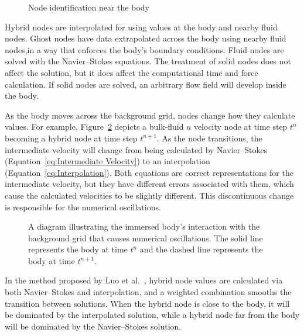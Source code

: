 \begin{figure}[!htb]
	\centering
	
	\caption{Node identification near the body}
	\label{fig:node id}
\end{figure}

Hybrid nodes are interpolated for using values at the body and nearby fluid nodes. 
Ghost nodes have data extrapolated across the body using nearby fluid nodes,in a way that enforces the body's boundary conditions.
Fluid nodes are solved with the Navier--Stokes equations. 
The treatment of solid nodes does not affect the solution, but it does affect the computational time and force calculation. 
If solid nodes are solved, an arbitrary flow field will develop inside the body. 

As the body moves across the background grid, nodes change how they calculate values. 
For example, Figure~\ref{fig:Temporal Discontinuity} depicts a bulk-fluid $u$ velocity node at time step $t^n$ becoming a hybrid node at time step $t^{n+1}$. 
As the node transitions, the intermediate velocity will change from being calculated by Navier--Stokes (Equation~\eqref{eq:Intermediate Velocity}) to an interpolation (Equation~\eqref{eq:Interpolation}). 
Both equations are correct representations for the intermediate velocity, but they have different errors associated with them, which cause the calculated velocities to be slightly different. 
This discontinuous change is responsible for the numerical oscillations. 

\begin{figure}[!htb]
    \centering
    
    \caption{A diagram illustrating the immersed body's interaction with the background grid that causes numerical oscillations. The solid line represents the body at time $t^n$ and the dashed line represents the body at time $t^{n+1}$.}
    \label{fig:Temporal Discontinuity}
\end{figure}

In the method proposed by Luo et al.~\cite{Luo:2012gx}, hybrid node values are calculated via both Navier--Stokes and interpolation, and a weighted combination smooths the transition between solutions. 
When the hybrid node is close to the body, it will be dominated by the interpolated solution, while a hybrid node far from the body will be dominated by the Navier--Stokes solution. 

